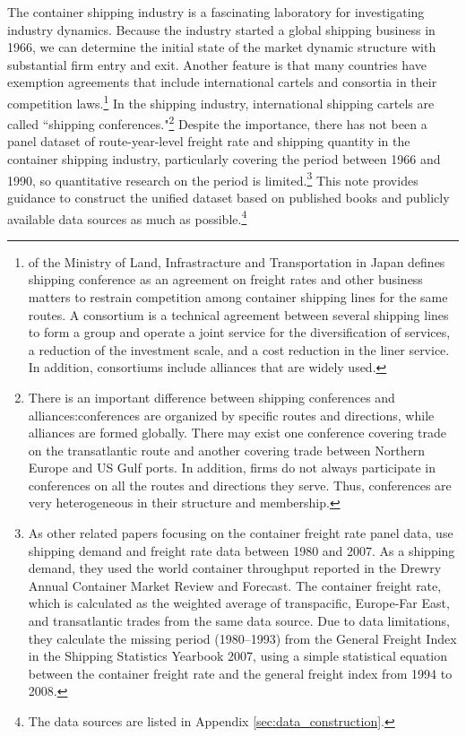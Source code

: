 \documentclass[11pt]{article}
\begin{document}
The container shipping industry is a fascinating laboratory for investigating industry dynamics. Because the industry started a global shipping business in 1966, we can determine the initial state of the market dynamic structure with substantial firm entry and exit. Another feature is that many countries have exemption agreements that include international cartels and consortia in their competition laws.\footnote{\cite{Anteitekina_kokusaikaijouyusoukakuhonotameno_kaijiseisakuno_arikatanitsuite2007} of the Ministry of Land, Infrastracture and Transportation in Japan defines shipping conference as an agreement on freight rates and other business matters to restrain competition among container shipping lines for the same routes. A consortium is a technical agreement between several shipping lines to form a group and operate a joint service for the diversification of services, a reduction of the investment scale, and a cost reduction in the liner service. In addition, consortiums include alliances that are widely used. } In the shipping industry, international shipping cartels are called ``shipping conferences."\footnote{There is an important difference between shipping conferences and alliances:conferences are organized by specific routes and directions, while alliances are formed globally. There may exist one conference covering trade on the transatlantic route and another covering trade between Northern Europe and US Gulf ports. In addition, firms do not always participate in conferences on all the routes and directions they serve. Thus, conferences are very heterogeneous in their structure and membership.} Despite the importance, there has not been a panel dataset of route-year-level freight rate and shipping quantity in the container shipping industry, particularly covering the period between 1966 and 1990, so quantitative research on the period is limited.\footnote{As other related papers focusing on the container freight rate panel data, \cite{luo2009econometric} use shipping demand and freight rate data between 1980 and 2007. As a shipping demand, they used the world container throughput reported in the Drewry Annual Container Market Review and Forecast. The container freight rate, which is calculated as the weighted average of transpacific, Europe-Far East, and transatlantic trades from the same data source. Due to data limitations, they calculate the missing period (1980–1993) from the General Freight Index in the Shipping Statistics Yearbook 2007, using a simple statistical equation between the container freight rate and the general freight index from 1994 to 2008.} This note  provides guidance to construct the unified dataset based on published books and publicly available data sources as much as possible.\footnote{The data sources are listed in Appendix \ref{sec:data_construction}.} 
\end{document}
